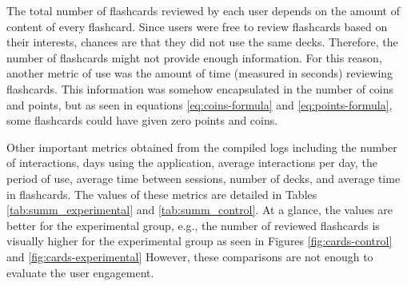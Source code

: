 The total number of flashcards reviewed by each user depends on the amount of content of every flashcard. Since users were free to review flashcards based on their interests, chances are that they did not use the same decks. Therefore, the number of flashcards might not provide enough information. For this reason, another metric of use was the amount of time (measured in seconds) reviewing flashcards. This information was somehow encapsulated in the number of coins and points, but as seen in equations \ref{eq:coins-formula} and \ref{eq:points-formula}, some flashcards could have given zero points and coins.

Other important metrics obtained from the compiled logs including the number of interactions, days using the application, average interactions per day, the period of use, average time between sessions, number of decks, and average time in flashcards. The values of these metrics are detailed in Tables \ref{tab:summ_experimental} and \ref{tab:summ_control}. At a glance, the values are better for the experimental group, e.g., the number of reviewed flashcards is visually higher for the experimental group as seen in Figures \ref{fig:cards-control} and \ref{fig:cards-experimental} However, these comparisons are not enough to evaluate the user engagement.

